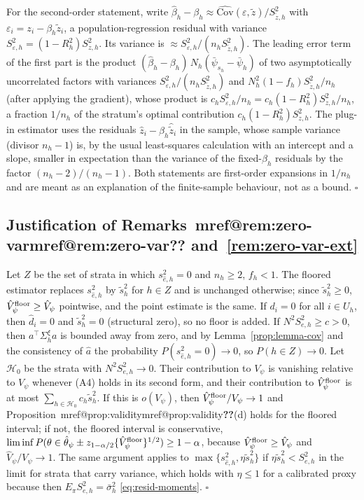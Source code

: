\documentclass[pdflatex,sn-mathphys-num,iicol]{sn-jnl}
\makeatletter
\theoremstyle{thmstyleone}
\theoremstyle{thmstyletwo}
\theoremstyle{thmstylethree}
\newcommand{\Mref}[1]{\ifcsname mref@#1\endcsname\csname mref@#1\endcsname\else\textbf{??}\fi}
\makeatother
\begin{document}
For the second-order statement, write $\hat\beta_h-\beta_h\approx\widehat{\mathrm{Cov}}(\varepsilon,\tilde z)/S^2_{\tilde z,h}$ with $\varepsilon_i=z_i-\beta_h\tilde z_i$, a population-regression residual with variance $S^2_{\varepsilon,h}=(1-R_h^2)S^2_{z,h}$.
Its variance is $\approx S^2_{\varepsilon,h}/(n_hS^2_{\tilde z,h})$. The leading error term of the first part is the product $(\hat\beta_h-\beta_h)\,N_h(\bar\psi_{s_h}-\bar\psi_h)$ of two asymptotically uncorrelated factors with variances
$S^2_{\varepsilon,h}/(n_hS^2_{\tilde z,h})$ and $N_h^2(1-f_h)S^2_{\tilde z,h}/n_h$ (after applying the gradient), whose product is $c_hS^2_{\varepsilon,h}/n_h=c_h(1-R_h^2)S^2_{z,h}/n_h$, a fraction $1/n_h$ of the stratum's optimal
contribution $c_h(1-R_h^2)S^2_{z,h}$. The plug-in estimator uses the residuals $\hat z_i-\hat\beta_h\hat{\tilde z}_i$ in the sample, whose sample variance (divisor $n_h-1$) is, by the usual least-squares calculation with an
intercept and a slope, smaller in expectation than the variance of the fixed-$\beta_h$ residuals by the factor $(n_h-2)/(n_h-1)$. Both statements are first-order expansions in $1/n_h$ and are meant as an explanation of the finite-sample behaviour, not as a bound. $\square$

\subsection{Justification of Remarks~\Mref{rem:zero-var} and~\ref{rem:zero-var-ext}}

Let $Z$ be the set of strata in which $s^2_{\hat e,h}=0$ and $n_h\ge2$, $f_h<1$. The floored estimator replaces $s^2_{\hat e,h}$ by $\tilde s^2_h$ for $h\in Z$ and is unchanged otherwise; since $\tilde s^2_h\ge0$, $\hat V^{\rm floor}_\psi\ge\hat V_\psi$ pointwise, and the point estimate is the same.
If $d_i=0$ for all $i\in U_h$, then $\hat d_i=0$ and $\tilde s^2_h=0$ (structural zero), so no floor is added. If $N^2S^2_{e,h}\ge c>0$, then $a^\top\Sigma^\xi_ha$ is bounded away from zero, and by Lemma~\ref{prop:lemma-cov} and the consistency of $\hat a$ the
probability $P(s^2_{\hat e,h}=0)\to0$, so $P(h\in Z)\to0$. Let $\mathcal H_0$ be the strata with $N^2S^2_{e,h}\to0$. Their contribution to $V_\psi$ is vanishing relative to $V_\psi$ whenever (A4) holds in its second form, and their contribution to
$\hat V^{\rm floor}_\psi$ is at most $\sum_{h\in\mathcal H_0}c_h\tilde s^2_h$. If this is $o(V_\psi)$, then $\hat V^{\rm floor}_\psi/V_\psi\to1$ and Proposition~\Mref{prop:validity}(d) holds for the floored interval; if not, the floored interval is
conservative, $\liminf P(\theta\in\hat\theta_\psi\pm z_{1-\alpha/2}\{\hat V^{\rm floor}_\psi\}^{1/2})\ge1-\alpha$, because $\hat V^{\rm floor}_\psi\ge\hat V_\psi$ and $\hat V_\psi/V_\psi\to1$. The same argument applies to $\max\{s^2_{\hat e,h},\eta\tilde s^2_h\}$ if $\eta\tilde s^2_h<S^2_{e,h}$
in the limit for strata that carry variance, which holds with $\eta\le1$ for a calibrated proxy because then $E_\pi S^2_{e,h}=\bar\sigma^2_h$ \eqref{eq:resid-moments}. $\square$
\end{document}
